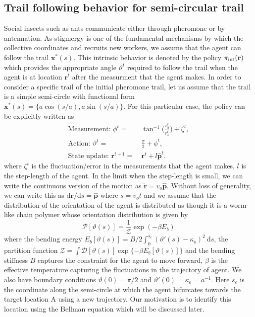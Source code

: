 \documentclass[%
reprint,
superscriptaddress,
floatfix,
amsmath,
amssymb,
aps,
notitlepage
]{revtex4-1}
\def\d{\text{d}}
\def\r{\mathbf{r}}
\def\x{\mathbf{x}}
\def\xst{\mathbf{x}^*}
\def\ph{\hat{\mathbf{p}}}
\def\P{\mathcal{P}}
\def\theta{\vartheta}
\begin{document}
\subsection*{Trail following behavior for semi-circular trail}
Social insects such as ants communicate either through pheromone or by antennation.
As stigmergy is one of the fundamental mechanisms by which the collective coordinates
and recruits new workers, we assume that the agent can follow the trail $\x^*(s)$.
This intrinsic behavior is denoted by the policy $\pi_{\rm int}(\r)$ which provides the
appropriate angle $\theta^t$ required to follow the trail when the agent is at location
$\r^t$ after the measurment that the agent makes. In order to consider a specific trail
of the initial pheromone trail, let us assume that the trail is a simple semi-circle with
functional form $\xst(s) = \{ a \cos(s/a), a \sin(s/a) \}$. For this particular case,
the policy can be explicitly written as
\begin{align}
    \text{Measurement: } \phi^{t} = & \ \tan^{-1} \bigg( \frac{r_y^t}{r_x^t} \bigg) + \zeta^t, \\
    \text{Action: }\theta^{t} =& \ \frac{\pi}{2} + \phi^{t}, \\
    \text{State update: } \r^{t+1} =& \ \r^t + l \ph^{t}.
\end{align}
where $\zeta^t$ is the fluctuation/error in the measurements that the agent makes, $l$ is the step-length
of the agent. In the limit when the step-length is small, we can write the continuous version
of the motion as $\dot{\r} = v_o \ph$. Without loss of generality, we can write this as
$\d\r/\d s = \ph$ where $s = v_o t$ and we assume that the distribution of the orientation of the agent is distributed as though
it is a worm-like chain polymer whose orientation distribution is given by
\[
    \P[\theta(s)] = \frac{1}{\mathcal{Z}}\exp{(-\beta E_b)}
\]
where the bending energy $E_b[\theta(s)] = B/2 \int_0^{s_c} (\theta'(s)-\kappa_o)^2 \ \d s$, the partition
function $\mathcal{Z} = \int \mathcal{D}[\theta(s)] \exp\{ {-\beta E_b[\theta(s)]} \}$ and the bending
stiffness $B$ captures the constraint for the agent to move forward, $\beta$ is the effective
temperature capturing the fluctuations in the trajectory of agent. We also have
boundary conditions $\theta(0) = \pi/2$ and $\theta'(0) = \kappa_o = a^{-1}$. Here $s_c$ is the coordinate
along the semi-circle at which the agent bifurcates towards the target location A using a new trajectory.
Our motivation is to identify this location using the Bellman equation which will be discussed later.
\end{document}
